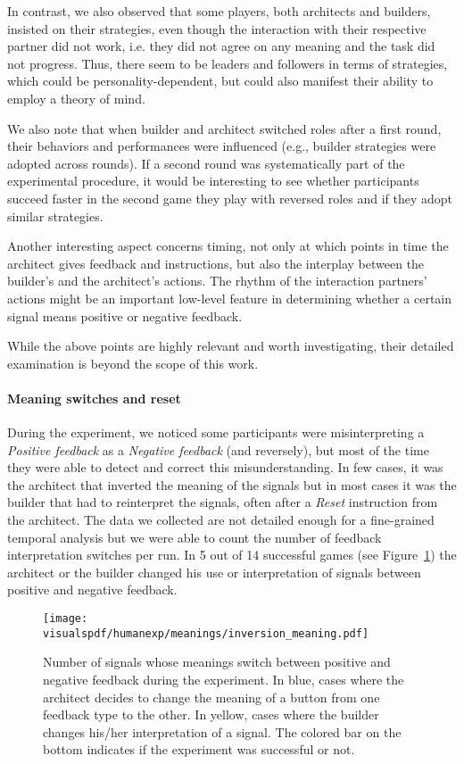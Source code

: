 In contrast, we also observed that some players, both architects and builders, insisted on their strategies, even though the interaction with their respective partner did not work, i.e. they did not agree on any meaning and the task did not progress. Thus, there seem to be leaders and followers in terms of strategies, which could be personality-dependent, but could also manifest their ability to employ a theory of mind.

We also note that when builder and architect switched roles after a first round, their behaviors and performances were influenced (e.g., builder strategies were adopted across rounds). If a second round was systematically part of the experimental procedure, it would be interesting to see whether participants succeed faster in the second game they play with reversed roles and if they adopt similar strategies.

Another interesting aspect concerns timing, not only at which points in time the architect gives feedback and instructions, but also the interplay between the builder's and the architect's actions. The rhythm of the interaction partners' actions might be an important low-level feature in determining whether a certain signal means positive or negative feedback.

While the above points are highly relevant and worth investigating, their detailed examination is beyond the scope of this work.

\paragraph{Meaning switches and reset} 

During the experiment, we noticed some participants were misinterpreting a \emph{Positive feedback} as a \emph{Negative feedback} (and reversely), but most of the time they were able to detect and correct this misunderstanding. In few cases, it was the architect that inverted the meaning of the signals but in most cases it was the builder that had to reinterpret the signals, often after a \emph{Reset} instruction from the architect. The data we collected are not detailed enough for a fine-grained temporal analysis but we were able to count the number of feedback interpretation switches per run. In 5 out of 14 successful games (see Figure~\ref{fig:feedback_switch_enhanced}) the architect or the builder changed his use or interpretation of signals between positive and negative feedback.

\begin{figure}[!htbp]
  \begin{center}
      \texttt{[image: \\visualspdf/humanexp/meanings/inversion\_meaning.pdf]}
      \caption{Number of signals whose meanings switch between positive and negative feedback during the experiment. In blue, cases where the architect decides to change the meaning of a button from one feedback type to the other. In yellow, cases where the builder changes his/her interpretation of a signal. The colored bar on the bottom indicates if the experiment was successful or not.}
    \label{fig:feedback_switch_enhanced}
    \end{center}
\end{figure}



